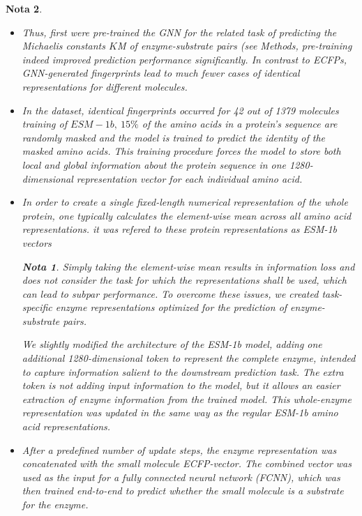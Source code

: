 \documentclass[12pt]{article}
\newtheorem{Note}{Nota}%
\begin{document}
\begin{Note}
\begin{itemize}
\item Thus,  first were pre-trained the GNN for the related task of predicting the Michaelis constants $K$M of enzyme-substrate pairs (see Methods,  pre-training indeed improved prediction performance significantly.  In contrast to ECFPs, GNN-generated fingerprints lead to much fewer cases of identical representations for different molecules. 

\item In the dataset, identical fingerprints occurred for 42 out of 1379 molecules training of $ESM-1b, ~15\%$ of the amino acids in a protein’s sequence are randomly masked and the model is trained to predict the identity of the masked amino acids. This training procedure forces the model to store both local and global information about the protein sequence in one 1280-dimensional representation vector for each individual amino acid. 

\item In order to create a single fixed-length numerical representation of the whole protein, one typically calculates the element-wise mean across all amino acid representations\cite{2.34,2.35,2.49}. it was refered to these protein representations as ESM-1b vectors

\begin{Note}
Simply taking the element-wise mean results in information loss and does not consider the task for which the representations shall be used, which can lead to subpar performance. To overcome these issues, we created task-specific enzyme representations optimized for the prediction of enzyme-substrate pairs. 

We slightly modified  the architecture of the ESM-1b model, adding one additional 1280-dimensional token to represent the complete enzyme, intended to capture information salient to the downstream prediction task. The extra token is not adding input information to the model, but it allows an easier extraction of enzyme information from the trained model. This whole-enzyme representation was updated in the same way as the regular ESM-1b amino acid representations.
\end{Note}

\item After a predefined number of update steps, the enzyme representation was concatenated with the small molecule ECFP-vector. The combined vector was used as the input for a fully connected neural network (FCNN), which was then trained end-to-end to predict whether the small molecule is a substrate for the enzyme. 


\end{itemize}
\end{Note}
\end{document}
